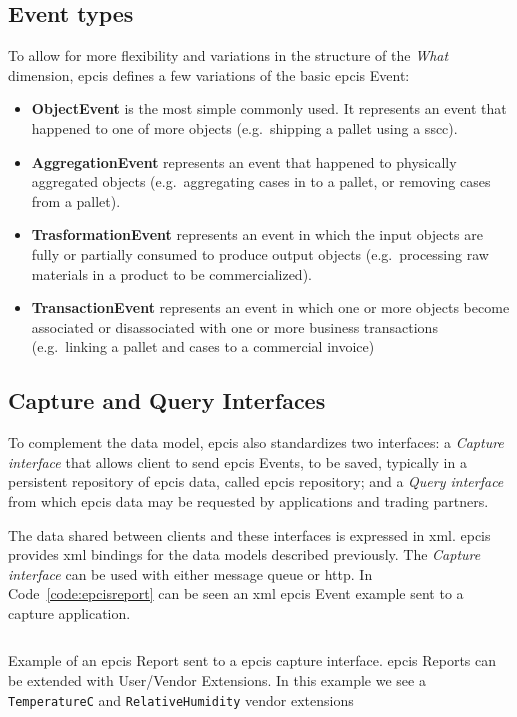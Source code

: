 \subsection{Event types}

To allow for more flexibility and variations in the structure of the \emph{What} dimension, \ac{epcis} defines a few variations of the basic \ac{epcis} Event:

\begin{itemize}
    \item \textbf{ObjectEvent} is the most simple commonly used. It represents an event that happened to one of more objects (e.g.\ shipping a pallet using a \ac{sscc}).
    \item \textbf{AggregationEvent} represents an event that happened to physically aggregated objects (e.g.\ aggregating cases in to a pallet, or removing cases from a pallet).
    \item \textbf{TrasformationEvent} represents an event in which the input objects are fully or partially consumed to produce output objects (e.g.\ processing raw materials in a product to be commercialized).
    \item \textbf{TransactionEvent} represents an event in which one or more objects become associated or disassociated with one or more business transactions (e.g.\ linking a pallet and cases to a commercial invoice)
\end{itemize}

\subsection{Capture and Query Interfaces}

To complement the data model, \ac{epcis} also standardizes two interfaces: a \emph{Capture interface} that allows client to send \ac{epcis} Events, to be saved, typically in a persistent repository of \ac{epcis} data, called \ac{epcis} repository; and a \emph{Query interface} from which \ac{epcis} data may be requested by applications and trading partners.

The data shared between clients and these interfaces is expressed in \ac{xml}. \ac{epcis} provides \ac{xml} bindings for the data models described previously.
The \emph{Capture interface} can be used with either message queue or \ac{http}. In Code~\ref{code:epcisreport} can be seen an \ac{xml} \ac{epcis} Event example sent to a capture application. 

\begin{listing}
    \inputminted[linenos, breaklines]{xml}{./code/sota/EPCIS_query_response.xml}
    \caption[Example of an \ac{epcis} Report sent to a \ac{epcis} capture interface]{Example of an \ac{epcis} Report sent to a \ac{epcis} capture interface. \ac{epcis} Reports can be extended with User/Vendor Extensions. In this example we see a \texttt{TemperatureC} and \texttt{RelativeHumidity} vendor extensions}
    \label{code:epcisreport}
\end{listing}

